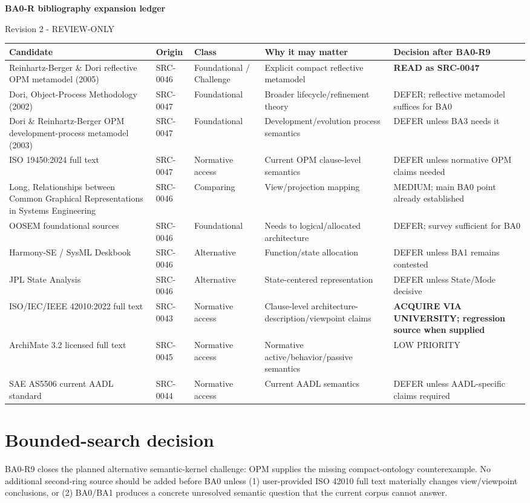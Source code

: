 \documentclass[10pt,a4paper]{article}
\begin{document}
\begin{landscape}
\begin{center}{\LARGE\bfseries BA0-R bibliography expansion ledger}\par{\large Revision 2 - REVIEW-ONLY}\end{center}
\scriptsize
\begin{longtable}{p{4.5cm}p{2.0cm}p{3.0cm}p{6.5cm}p{5.5cm}}
\toprule Candidate & Origin & Class & Why it may matter & Decision after BA0-R9\\\midrule\endhead
Reinhartz-Berger \& Dori reflective OPM metamodel (2005) & SRC-0046 & Foundational / Challenge & Explicit compact reflective metamodel & \textbf{READ as SRC-0047}\\
Dori, Object-Process Methodology (2002) & SRC-0047 & Foundational & Broader lifecycle/refinement theory & DEFER; reflective metamodel suffices for BA0\\
Dori \& Reinhartz-Berger OPM development-process metamodel (2003) & SRC-0047 & Foundational & Development/evolution process semantics & DEFER unless BA3 needs it\\
ISO 19450:2024 full text & SRC-0047 & Normative access & Current OPM clause-level semantics & DEFER unless normative OPM claims needed\\
Long, Relationships between Common Graphical Representations in Systems Engineering & SRC-0046 & Comparing & View/projection mapping & MEDIUM; main BA0 point already established\\
OOSEM foundational sources & SRC-0046 & Foundational & Needs to logical/allocated architecture & DEFER; survey sufficient for BA0\\
Harmony-SE / SysML Deskbook & SRC-0046 & Alternative & Function/state allocation & DEFER unless BA1 remains contested\\
JPL State Analysis & SRC-0046 & Alternative & State-centered representation & DEFER unless State/Mode decisive\\
ISO/IEC/IEEE 42010:2022 full text & SRC-0043 & Normative access & Clause-level architecture-description/viewpoint claims & \textbf{ACQUIRE VIA UNIVERSITY; regression source when supplied}\\
ArchiMate 3.2 licensed full text & SRC-0045 & Normative access & Normative active/behavior/passive semantics & LOW PRIORITY\\
SAE AS5506 current AADL standard & SRC-0044 & Normative access & Current AADL semantics & DEFER unless AADL-specific claims required\\
\bottomrule
\end{longtable}
\normalsize
\section{Bounded-search decision}
BA0-R9 closes the planned alternative semantic-kernel challenge: OPM supplies the missing compact-ontology counterexample. No additional second-ring source should be added before BA0 unless (1) user-provided ISO 42010 full text materially changes view/viewpoint conclusions, or (2) BA0/BA1 produces a concrete unresolved semantic question that the current corpus cannot answer.
\end{landscape}
\end{document}
